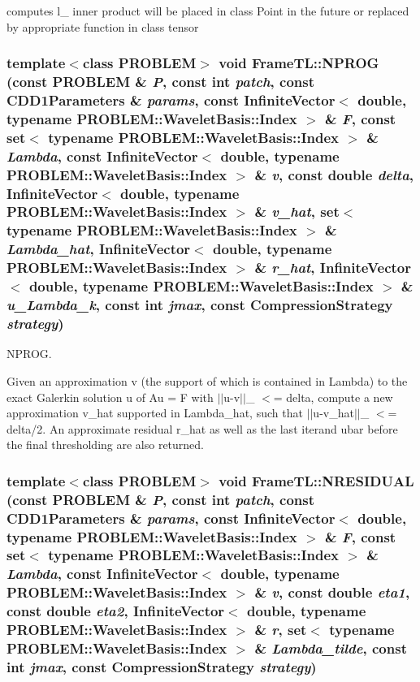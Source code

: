 computes l\_ inner product will be placed in class Point in the future or replaced by appropriate function in class tensor \hypertarget{namespaceFrameTL_d25b2eb9873b17224cdc0ddc9b0d04b1}{
\subsubsection[NPROG]{\setlength{\rightskip}{0pt plus 5cm}template$<$class PROBLEM$>$ void FrameTL::NPROG (const PROBLEM \& {\em P}, \/  const int {\em patch}, \/  const CDD1Parameters \& {\em params}, \/  const InfiniteVector$<$ double, typename PROBLEM::WaveletBasis::Index $>$ \& {\em F}, \/  const set$<$ typename PROBLEM::WaveletBasis::Index $>$ \& {\em Lambda}, \/  const InfiniteVector$<$ double, typename PROBLEM::WaveletBasis::Index $>$ \& {\em v}, \/  const double {\em delta}, \/  InfiniteVector$<$ double, typename PROBLEM::WaveletBasis::Index $>$ \& {\em v\_\-hat}, \/  set$<$ typename PROBLEM::WaveletBasis::Index $>$ \& {\em Lambda\_\-hat}, \/  InfiniteVector$<$ double, typename PROBLEM::WaveletBasis::Index $>$ \& {\em r\_\-hat}, \/  InfiniteVector$<$ double, typename PROBLEM::WaveletBasis::Index $>$ \& {\em u\_\-Lambda\_\-k}, \/  const int {\em jmax}, \/  const CompressionStrategy {\em strategy})}}
\label{namespaceFrameTL_d25b2eb9873b17224cdc0ddc9b0d04b1}


NPROG. 

Given an approximation v (the support of which is contained in Lambda) to the exact Galerkin solution u of Au = F with $|$$|$u-v$|$$|$\_ $<$= delta, compute a new approximation v\_\-hat supported in Lambda\_\-hat, such that $|$$|$u-v\_\-hat$|$$|$\_ $<$= delta/2. An approximate residual r\_\-hat as well as the last iterand ubar before the final thresholding are also returned. \hypertarget{namespaceFrameTL_e86daf5e125e66504844e002ba3dc4b5}{
\subsubsection[NRESIDUAL]{\setlength{\rightskip}{0pt plus 5cm}template$<$class PROBLEM$>$ void FrameTL::NRESIDUAL (const PROBLEM \& {\em P}, \/  const int {\em patch}, \/  const CDD1Parameters \& {\em params}, \/  const InfiniteVector$<$ double, typename PROBLEM::WaveletBasis::Index $>$ \& {\em F}, \/  const set$<$ typename PROBLEM::WaveletBasis::Index $>$ \& {\em Lambda}, \/  const InfiniteVector$<$ double, typename PROBLEM::WaveletBasis::Index $>$ \& {\em v}, \/  const double {\em eta1}, \/  const double {\em eta2}, \/  InfiniteVector$<$ double, typename PROBLEM::WaveletBasis::Index $>$ \& {\em r}, \/  set$<$ typename PROBLEM::WaveletBasis::Index $>$ \& {\em Lambda\_\-tilde}, \/  const int {\em jmax}, \/  const CompressionStrategy {\em strategy})}}
\label{namespaceFrameTL_e86daf5e125e66504844e002ba3dc4b5}


